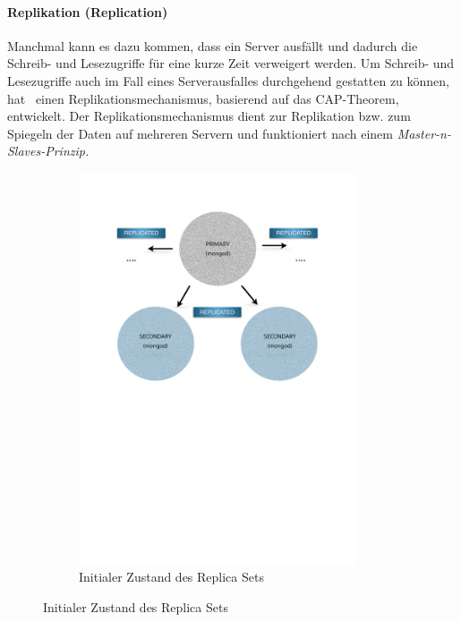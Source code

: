 \paragraph{Replikation (Replication)}\label{replication}
Manchmal kann es dazu kommen, dass ein Server ausfällt und dadurch die Schreib- und Lesezugriffe für eine kurze Zeit verweigert werden. Um Schreib- und Lesezugriffe auch im Fall eines Serverausfalles durchgehend gestatten zu können, hat \mongo\ einen Replikationsmechanismus, basierend auf das CAP-Theorem, entwickelt. Der Replikationsmechanismus dient zur Replikation bzw. zum Spiegeln der Daten auf mehreren Servern und funktioniert nach einem \textit{Master-n-Slaves-Prinzip.}
\begin{figure}[H]
   \begin{subfigure}[t]{0.49\textwidth}\vspace{0pt}
   \centering
      \includegraphics[trim = 28mm 139mm 28mm 29mm, clip, width=0.9\textwidth]{resources/replicaSet/createReplicaSet2}
      \caption[Initialer Zustand des Replica Sets]{Initialer Zustand des Replica Sets}

\end{subfigure}
\end{figure}
